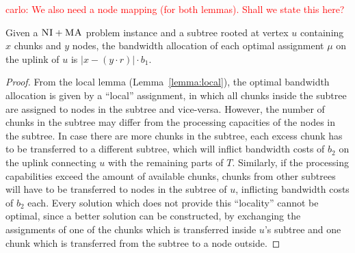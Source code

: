 \documentclass[9pt]{sigcomm-alternate}
\newcommand{\carlo}[1]{\textcolor{red}{carlo: #1}}
\newcommand{\MaFactor}{r}
\newcommand{\VmChunkAssignment}{\mu}
\newcommand{\CC}{\textsc{NI}}
\newcommand{\MA}{\textsc{MA}}
\newcommand{\Tree}{\ensuremath{T}}
\newcommand{\CostTrans}{\ensuremath{b_1}}
\newcommand{\CostCom}{\ensuremath{b_2}}
\begin{document}
\carlo{We also need a node mapping (for both lemmas). Shall we state this here?}

\begin{lemma}
Given a $\CC+\MA$ problem instance and a subtree rooted at vertex $u$ containing $x$
chunks and $y$ nodes, the bandwidth allocation of each optimal assignment
$\VmChunkAssignment$ on the uplink of $u$ is $|x-(y\cdot\MaFactor)|\cdot
\CostTrans$.\label{lemma:uplink}
\end{lemma}
\begin{proof}
From the local lemma (Lemma~\ref{lemma:local}), 
the optimal bandwidth allocation is given by 
a ``local'' assignment, in which all chunks inside the
subtree are assigned to nodes in the subtree and vice-versa. However, the
number of chunks in the subtree may differ from the processing capacities of
the nodes in the subtree. In case there are more chunks in the subtree, each
excess chunk has to be transferred to a different subtree, which will
inflict bandwidth costs of $\CostCom$ on the uplink connecting $u$ with the
remaining parts of $\Tree$. Similarly, if the processing capabilities exceed the amount of
available chunks, chunks from other subtrees will have to be transferred to
nodes in the subtree of $u$, inflicting bandwidth costs of $\CostCom$ each. 
Every solution
which does not provide this ``locality'' cannot be optimal, since a better
solution can be constructed, by exchanging the assignments of one of the chunks
which is transferred inside $u$'s subtree and one chunk which is transferred from
the subtree to a node outside.
\end{proof}
\end{document}
